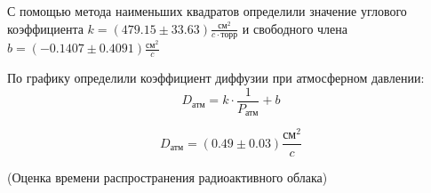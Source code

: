С помощью метода наименьших квадратов определили значение углового коэффициента 
$k = (479.15 \pm 33.63)\frac{\text{см}^2}{c\cdot \text{торр}}$ и свободного члена $b = (-0.1407 \pm 0.4091)\frac{\text{см}^2}{c}$

По графику определили коэффициент диффузии при атмосферном давлении:
\begin{equation}
     D_{\text{атм}} = k \cdot \frac{1}{P_\text{атм}} + b
\end{equation}

\[ D_{\text{атм}} = (0.49 \pm 0.03)\frac{\text{см}^2}{c}\]

(Оценка времени распространения радиоактивного облака)


